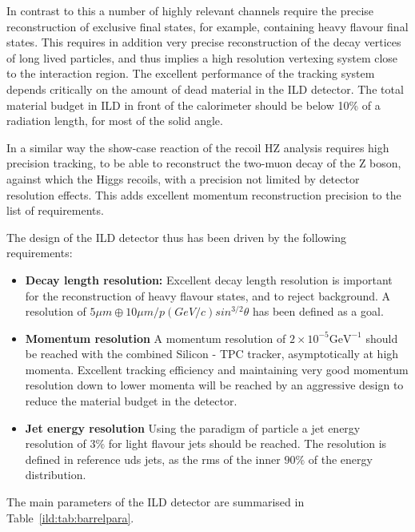 \documentclass[%
 amsmath,amssymb,
 aps,
]{revtex4-1}
\begin{document}
In contrast to this a number of highly relevant channels require the precise reconstruction of exclusive final states, for example, containing heavy flavour final states. This requires in addition very precise reconstruction of the decay vertices of long lived particles, and thus implies a high resolution vertexing system close to the interaction region. 
The excellent performance of the tracking system  depends critically on the amount of dead material in the ILD detector. The total material budget in ILD in front of the calorimeter should be below 10\% of a radiation length, for most of the solid angle.


In a similar way the show-case reaction of the recoil HZ analysis requires high precision tracking, to be able to reconstruct the two-muon decay of the Z boson, against which the Higgs recoils, with a precision not limited by detector resolution effects. This adds excellent momentum reconstruction precision to the list of requirements. 

The design of the ILD detector thus has been driven by the following requirements: 
\begin{itemize}
    \item {\bf Decay length resolution:} Excellent decay length resolution is important for the reconstruction of heavy flavour states, and to reject background. A resolution of $ 5 \mu m \oplus 10 \mu m / p(GeV/c)sin^{3/2}\theta$ has been defined as a goal. 
    \item {\bf Momentum resolution} A momentum resolution of $2 \times 10^{-5} \mathrm{GeV}^{-1}$ should be reached with the combined Silicon - TPC tracker, asymptotically at high momenta. Excellent tracking efficiency and maintaining very good momentum resolution down to lower momenta will be reached by an aggressive design to reduce the material budget in the detector. 
    \item {\bf Jet energy resolution} Using the paradigm of particle a jet energy resolution of $3\%$ for light flavour jets should be reached. The resolution is defined in reference uds jets, as the rms of the inner $90\%$ of the energy distribution. 
\end{itemize}


The main parameters of the ILD detector are summarised in Table~\ref{ild:tab:barrelpara}.
\end{document}
